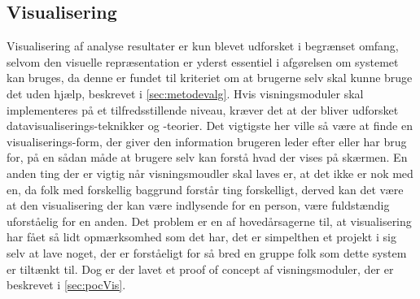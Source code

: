 \subsection{Visualisering}\label{sec:soevnVisVidArb}
Visualisering af analyse resultater er kun blevet udforsket i begrænset omfang, selvom den visuelle repræsentation er yderst essentiel i afgørelsen om systemet kan bruges, da denne er fundet til kriteriet om at brugerne selv skal kunne bruge det uden hjælp, beskrevet i \cref{sec:metodevalg}.
Hvis visningsmoduler skal implementeres på et tilfredsstillende niveau, kræver det at der bliver udforsket datavisualiserings-teknikker og -teorier.
Det vigtigste her ville så være at finde en visualiserings-form, der giver den information brugeren leder efter eller har brug for, på en sådan måde at brugere selv kan forstå hvad der vises på skærmen.
En anden ting der er vigtig når visningsmoudler skal laves er, at det ikke er nok med en, da folk med forskellig baggrund forstår ting forskelligt, derved kan det være at den visualisering der kan være indlysende for en person, være fuldstændig uforståelig for en anden.
Det problem er en af hovedårsagerne til, at visualisering har fået så lidt opmærksomhed som det har, det er simpelthen et projekt i sig selv at lave noget, der er forståeligt for så bred en gruppe folk som dette system er tiltænkt til.
Dog er der lavet et proof of concept af visningsmoduler, der er beskrevet i \cref{sec:pocVis}.